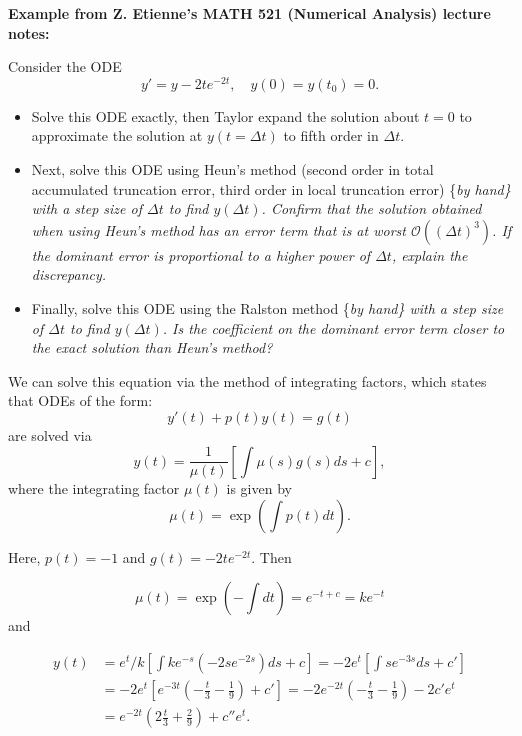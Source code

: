 \documentclass[landscape,letterpaper,10pt,english]{article}
\begin{document}
\textbf{Example from Z. Etienne's MATH 521 (Numerical Analysis) lecture
notes:}

Consider the ODE \[
y' = y - 2 t e^{-2t},\quad y(0)=y(t_0)=0.
\]

\begin{itemize}
\item
  Solve this ODE exactly, then Taylor expand the solution about \(t=0\)
  to approximate the solution at \(y(t=\Delta t)\) to fifth order in
  \(\Delta t\).
\item
  Next, solve this ODE using Heun's method (second order in total
  accumulated truncation error, third order in local truncation error)
  \{\it by hand\} with a step size of \(\Delta t\) to find
  \(y(\Delta t)\). Confirm that the solution obtained when using Heun's
  method has an error term that is at worst
  \(\mathcal{O}\left((\Delta t)^3\right)\). If the dominant error is
  proportional to a higher power of \(\Delta t\), explain the
  discrepancy.
\item
  Finally, solve this ODE using the Ralston method \{\it by hand\} with
  a step size of \(\Delta t\) to find \(y(\Delta t)\). Is the
  coefficient on the dominant error term closer to the exact solution
  than Heun's method?
\end{itemize}

We can solve this equation via the method of integrating factors, which
states that ODEs of the form: \[
y'(t) + p(t) y(t) = g(t)
\] are solved via \[
y(t) = \frac{1}{\mu(t)} \left[ \int \mu(s) g(s) ds + c \right],
\] where the integrating factor \(\mu(t)\) is given by \[
\mu(t) = \exp\left(\int p(t) dt\right).
\]

Here, \(p(t)=-1\) and \(g(t) = - 2 t e^{-2t}\). Then

\begin{equation}
\mu(t) = \exp\left(-\int dt\right) = e^{-t+c} = k e^{-t}
\end{equation} and

\begin{align}
y(t) &= e^t/k  \left[ \int k e^{-s} (- 2 s e^{-2s}) ds + c \right] = -2 e^t \left[ \int s e^{-3s} ds + c' \right] \\
&= -2 e^t \left[ e^{-3 t} \left(-\frac{t}{3}-\frac{1}{9}\right) + c' \right] = -2 e^{-2t} \left(-\frac{t}{3}-\frac{1}{9}\right) -2 c' e^t \\
&= e^{-2t} \left(2\frac{t}{3}+\frac{2}{9}\right) + c'' e^t. \\
\end{align}
\end{document}
